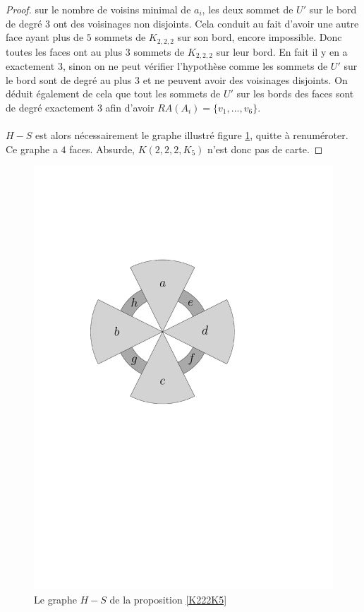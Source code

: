 \documentclass{scrartcl}
\begin{document}
\begin{flushleft}
\begin{proof}
    sur le nombre de voisins minimal de $a_i$, les deux sommet de $U'$ sur le bord de degré $3$ ont des voisinages non disjoints. Cela
    conduit au fait d'avoir une autre face ayant plus de $5$ sommets de $K_{2,2,2}$ sur son bord, encore impossible. Donc toutes les
    faces ont au plus $3$ sommets de $K_{2,2,2}$ sur leur bord. En fait il y en a exactement $3$, sinon on ne peut vérifier l'hypothèse comme
    les sommets de $U'$ sur le bord sont de degré au plus $3$ et ne peuvent avoir des voisinages disjoints. On déduit également de cela que tout les sommets
    de $U'$ sur les bords des faces sont de degré exactement $3$ afin d'avoir $RA(A_i) = \{v_1, ..., v_6\}$.
    \\~\\
    $H-S$ est alors nécessairement le graphe illustré figure \ref{temoinK222}, quitte à renuméroter.
    Ce graphe a $4$ faces. Absurde, $K(2,2,2,K_5)$ n'est donc pas de carte.
\end{proof}

\begin{figure}[h]
    \caption{Le graphe $H - S$ de la proposition \ref{K222K5}}\label{temoinK222}
    \begin{center}
        \includegraphics[page=\ipeFigtemoinK, scale = 0.5]{figs}
    \end{center}
\end{figure}


\end{flushleft}
\end{document}
